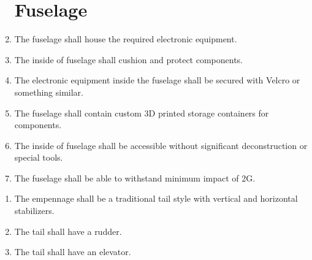 \documentclass{article}
\begin{document}
	\begin{enumerate}
		
		\section{Fuselage}
		
		\item The fuselage shall house the required electronic equipment.\\
		\item The inside of fuselage shall cushion and protect components.\\
		\item The electronic equipment inside the fuselage shall be secured with Velcro or something similar.\\
		\item The fuselage shall contain custom 3D printed storage containers for components.\\
		\item The inside of fuselage shall be accessible without significant deconstruction or special tools.\\
		\item The fuselage shall be able to withstand minimum impact of 2G.\\
	
	\end{enumerate}

	\begin{enumerate}
		
		\section{Empennage}
			
		\item The empennage shall be a traditional tail style with vertical and horizontal stabilizers.\\
		\item The tail shall have a rudder.\\
		\item The tail shall have an elevator.\\
		
	\end{enumerate}
\end{document}
